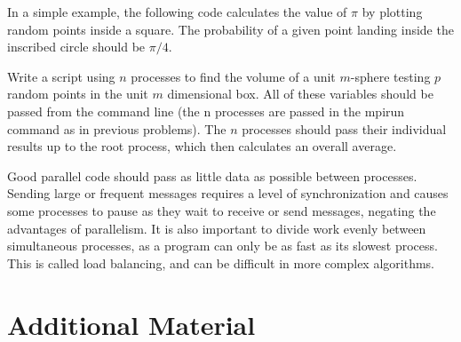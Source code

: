 In a simple example, the following code calculates the value of $\pi$ by plotting random points inside a square. 
The probability of a given point landing inside the inscribed circle should be $\pi/4$.


\begin{problem}
Write a script using $n$ processes to find the volume of a unit $m$-sphere testing $p$ random points in the unit $m$ dimensional box. 
All of these variables should be passed from the command line (the n processes are passed in the mpirun command as in previous problems). 
The $n$ processes should pass their individual results up to the root process, which then calculates an overall average. 
\end{problem}

\begin{info}
Good parallel code should pass as little data as possible between processes.
Sending large or frequent messages requires a level of synchronization and causes some processes to pause as they wait to receive or send messages, negating the advantages of parallelism. 
It is also important to divide work evenly between simultaneous processes, as a program can only be as fast as its slowest process. 
This is called load balancing, and can be difficult in more complex algorithms.
\end{info}

\section*{Additional Material} %

